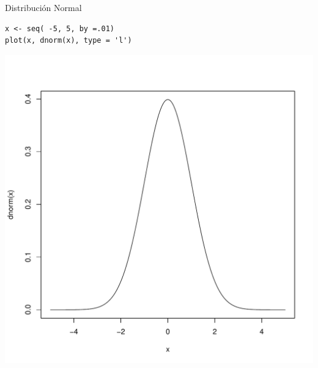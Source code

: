 \documentclass[xcolor={usenames,svgnames,dvipsnames}]{beamer}
\begin{document}
\begin{frame}[fragile,label=sec-3-4]{Distribución Normal}
 \lstset{language=R,label= ,caption= ,numbers=none}
\begin{lstlisting}
x <- seq( -5, 5, by =.01)
plot(x, dnorm(x), type = 'l')
\end{lstlisting}

\includegraphics[height=0.6\textheight]{figs/dnorm.pdf}
\end{frame}
\end{document}
